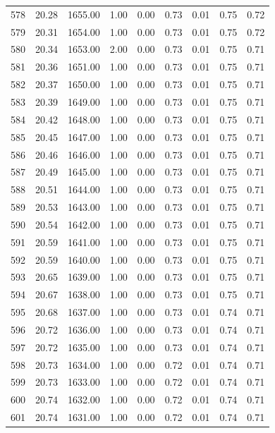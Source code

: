 \documentclass{article}\usepackage[]{graphicx}\usepackage[]{color}
\begin{document}
\begin{longtable}{rrrrrrrrr}
  578 & 20.28 & 1655.00 & 1.00 & 0.00 & 0.73 & 0.01 & 0.75 & 0.72 \\ 
  579 & 20.31 & 1654.00 & 1.00 & 0.00 & 0.73 & 0.01 & 0.75 & 0.72 \\ 
  580 & 20.34 & 1653.00 & 2.00 & 0.00 & 0.73 & 0.01 & 0.75 & 0.71 \\ 
  581 & 20.36 & 1651.00 & 1.00 & 0.00 & 0.73 & 0.01 & 0.75 & 0.71 \\ 
  582 & 20.37 & 1650.00 & 1.00 & 0.00 & 0.73 & 0.01 & 0.75 & 0.71 \\ 
  583 & 20.39 & 1649.00 & 1.00 & 0.00 & 0.73 & 0.01 & 0.75 & 0.71 \\ 
  584 & 20.42 & 1648.00 & 1.00 & 0.00 & 0.73 & 0.01 & 0.75 & 0.71 \\ 
  585 & 20.45 & 1647.00 & 1.00 & 0.00 & 0.73 & 0.01 & 0.75 & 0.71 \\ 
  586 & 20.46 & 1646.00 & 1.00 & 0.00 & 0.73 & 0.01 & 0.75 & 0.71 \\ 
  587 & 20.49 & 1645.00 & 1.00 & 0.00 & 0.73 & 0.01 & 0.75 & 0.71 \\ 
  588 & 20.51 & 1644.00 & 1.00 & 0.00 & 0.73 & 0.01 & 0.75 & 0.71 \\ 
  589 & 20.53 & 1643.00 & 1.00 & 0.00 & 0.73 & 0.01 & 0.75 & 0.71 \\ 
  590 & 20.54 & 1642.00 & 1.00 & 0.00 & 0.73 & 0.01 & 0.75 & 0.71 \\ 
  591 & 20.59 & 1641.00 & 1.00 & 0.00 & 0.73 & 0.01 & 0.75 & 0.71 \\ 
  592 & 20.59 & 1640.00 & 1.00 & 0.00 & 0.73 & 0.01 & 0.75 & 0.71 \\ 
  593 & 20.65 & 1639.00 & 1.00 & 0.00 & 0.73 & 0.01 & 0.75 & 0.71 \\ 
  594 & 20.67 & 1638.00 & 1.00 & 0.00 & 0.73 & 0.01 & 0.75 & 0.71 \\ 
  595 & 20.68 & 1637.00 & 1.00 & 0.00 & 0.73 & 0.01 & 0.74 & 0.71 \\ 
  596 & 20.72 & 1636.00 & 1.00 & 0.00 & 0.73 & 0.01 & 0.74 & 0.71 \\ 
  597 & 20.72 & 1635.00 & 1.00 & 0.00 & 0.73 & 0.01 & 0.74 & 0.71 \\ 
  598 & 20.73 & 1634.00 & 1.00 & 0.00 & 0.72 & 0.01 & 0.74 & 0.71 \\ 
  599 & 20.73 & 1633.00 & 1.00 & 0.00 & 0.72 & 0.01 & 0.74 & 0.71 \\ 
  600 & 20.74 & 1632.00 & 1.00 & 0.00 & 0.72 & 0.01 & 0.74 & 0.71 \\ 
  601 & 20.74 & 1631.00 & 1.00 & 0.00 & 0.72 & 0.01 & 0.74 & 0.71 \\ 

\end{longtable}
\end{document}
